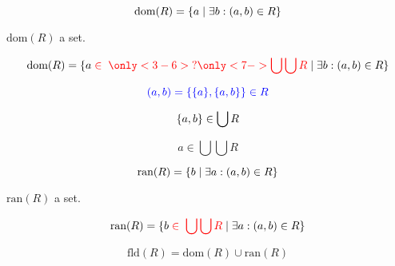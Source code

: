 
\begin{frame}{}
  \begin{center}
  \end{center}
\end{frame}

\begin{frame}{}
  \begin{definition}[Domain]
    \[
      \text{dom}(R) = \{a \mid \exists b: (a,b) \in R\}
    \]
  \end{definition}

  \pause
  \begin{theorem}
    $\text{dom}(R)$  a set.
  \end{theorem}

  \pause
  \[
    \text{dom}(R) = \set{a \;\red{\in\; \only<3-6>{?}\only<7->{\bigcup \bigcup R}} \mid \exists b: (a, b) \in R}
  \]


  \pause
  \[
    \textcolor{blue}{(a, b) = \{\{a\}, \{a, b\}\} \in R}
  \]

  \pause
  \[
    \{a, b\} \in \bigcup R
  \]

  \pause
  \[
    a \in \bigcup \bigcup R
  \]
\end{frame}

\begin{frame}{}
  \begin{definition}[Range]
    \[
      \text{ran}(R) = \{b \mid \exists a: (a,b) \in R\}
    \]
  \end{definition}

  \pause
  \begin{theorem}
    $\text{ran}(R)$  a set.
  \end{theorem}

  \[
    \text{ran}(R) = \{b \;\textcolor{red}{\in\; \bigcup \bigcup R} \mid \exists a: (a, b) \in R\}
  \]

  \pause
  \begin{definition}[Field]
    \[
      \text{fld}(R) = \text{dom}(R) \cup \text{ran}(R)
    \]
  \end{definition}
\end{frame}
